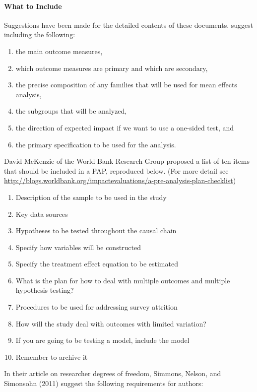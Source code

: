 \documentclass[12pt] {article}
\begin{document}
\paragraph{What to Include}
Suggestions have been made for the detailed contents of these documents.
\cite{glennerster_running_2013} suggest including the following:

\begin{enumerate}
\def\labelenumi{\arabic{enumi}.}
\item
  the main outcome measures,
\item
  which outcome measures are primary and which are secondary,
\item
  the precise composition of any families that will be used for mean
  effects analysis,
\item
  the subgroups that will be analyzed,
\item
  the direction of expected impact if we want to use a one-sided test,
  and
\item
  the primary specification to be used for the analysis.
\end{enumerate}
David McKenzie of the World Bank Research Group proposed a list of ten
items that should be included in a PAP, reproduced below. (For more
detail see
\url{http://blogs.worldbank.org/impactevaluations/a-pre-analysis-plan-checklist})

\begin{enumerate}
\item
  Description of the sample to be used in the study
\item
  Key data sources
\item
  Hypotheses to be tested throughout the causal chain
\item
  Specify how variables will be constructed
\item
  Specify the treatment effect equation to be estimated
\item
  What is the plan for how to deal with multiple outcomes and multiple
  hypothesis testing?
\item
  Procedures to be used for addressing survey attrition
\item
  How will the study deal with outcomes with limited variation?
\item
  If you are going to be testing a model, include the model
\item
  Remember to archive it
\end{enumerate}

In their article on researcher degrees of freedom, Simmons, Nelson, and
Simonsohn (2011) suggest the following requirements for authors:
\end{document}
